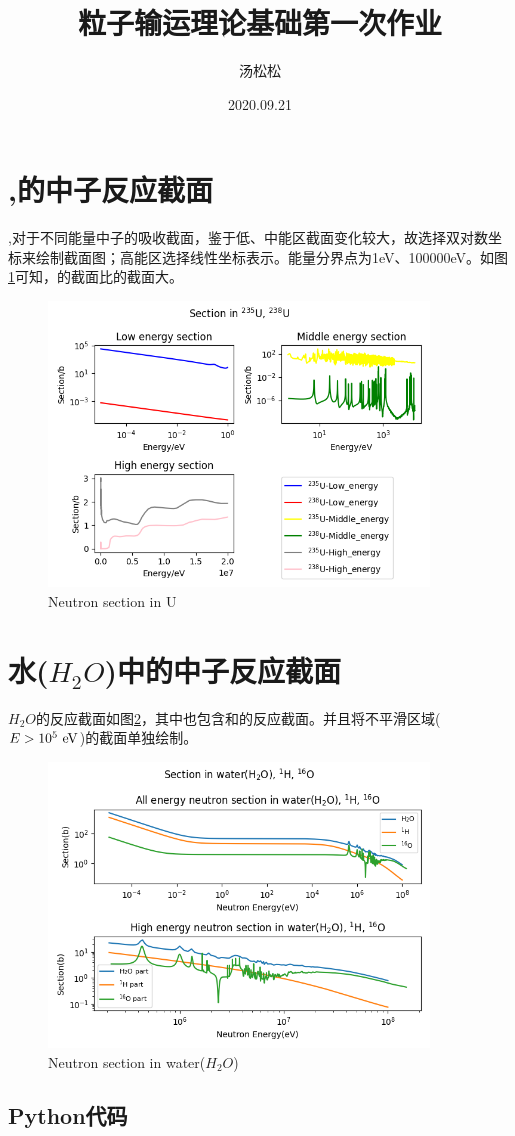 \documentclass[12pt]{ctexart}
\title{粒子输运理论基础第一次作业}
\author{汤松松 }
\date{2020.09.21}
\begin{document}
\maketitle
\section{,的中子反应截面}
,对于不同能量中子的吸收截面，鉴于低、中能区截面变化较大，故选择双对数坐标来绘制截面图；高能区选择线性坐标表示。能量分界点为1eV、100000eV。如图\ref{fig:U}可知，的截面比的截面大。
\begin{figure}[H]
    \centering
    \includegraphics[width=0.9\textwidth]{img/Neutron section in U}
    \caption{Neutron section in U}
    \label{fig:U}
\end{figure}
\section{水($H_2O$)中的中子反应截面}
$H_2O$的反应截面如图\ref{fig:H2O}，其中也包含和的反应截面。并且将不平滑区域($E > 10^5\ {\rm eV}$)的截面单独绘制。
\begin{figure}[H]
    \centering
    \includegraphics[width=0.9\textwidth]{img/Neutron section in water}
    \caption{Neutron section in water($H_2O$)}
    \label{fig:H2O}
\end{figure}

\begin{appendices}
\section{Python代码}

\end{appendices}
\end{document}
